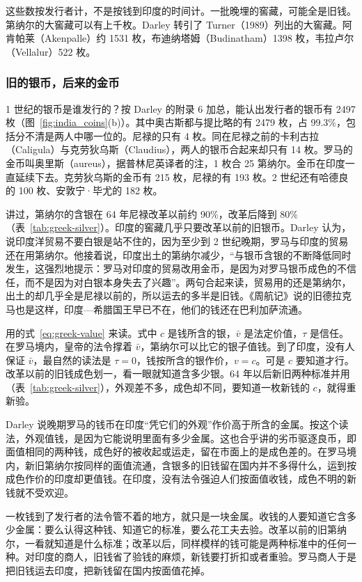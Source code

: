 这些数按发行者计，不是按钱到印度的时间计。一批晚埋的窖藏，可能全是旧钱。第纳尔的大窖藏可以有上千枚。Darley 转引了 Turner（1989）列出的大窖藏。阿肯帕莱（Akenpalle）约 1531 枚，布迪纳塔姆（Budinatham）1398 枚，韦拉卢尔（Vellalur）522 枚\cite{darley2014}。

\subsubsection{旧的银币，后来的金币}
1 世纪的银币是谁发行的？按 Darley 的附录 6 加总，能认出发行者的银币有 2497 枚（图~\ref{fig:india_coins}(b)）。其中奥古斯都与提比略的有 2479 枚，占 99.3\%，包括分不清是两人中哪一位的。尼禄的只有 4 枚。同在尼禄之前的卡利古拉（Caligula）与克劳狄乌斯（Claudius），两人的银币合起来却只有 14 枚。罗马的金币叫奥里斯（aureus），据普林尼英译者的注，1 枚合 25 第纳尔\cite{pliny}。金币在印度一直延续下去。克劳狄乌斯的金币有 215 枚，尼禄的有 193 枚。2 世纪还有哈德良的 100 枚、安敦宁·毕尤的 182 枚。

讲过，第纳尔的含银在 64 年尼禄改革以前约 90\%，改革后降到 80\%（表~\ref{tab:greek-silver}）。印度的窖藏几乎只要改革以前的旧银币。Darley 认为，说印度洋贸易不要白银是站不住的，因为至少到 2 世纪晚期，罗马与印度的贸易还在用第纳尔。他接着说，印度出土的第纳尔减少，“与银币含银的不断降低同时发生，这强烈地提示：罗马对印度的贸易改用金币，是因为对罗马银币成色的不信任，而不是因为对白银本身失去了兴趣”\cite{darley2014}。两句合起来读，贸易用的还是第纳尔，出土的却几乎全是尼禄以前的，所以运去的多半是旧钱。《周航记》说的旧德拉克马也是这样，印度—希腊国王早已不在，他们的钱还在巴利加萨流通\cite{periplus}。

用的式~\eqref{eq:greek-value} 来读。式中 $c$ 是钱所含的银，$\bar v$ 是法定价值，$\tau$ 是信任。在罗马境内，皇帝的法令撑着 $\bar v$，第纳尔可以比它的银子值钱。到了印度，没有人保证 $\bar v$，最自然的读法是 $\tau=0$，钱按所含的银作价，$v=c$。可是 $c$ 要知道才行。改革以前的旧钱成色划一，看一眼就知道含多少银。64 年以后新旧两种标准并用（表~\ref{tab:greek-silver}），外观差不多，成色却不同，要知道一枚新钱的 $c$，就得重新验。

Darley 说晚期罗马的钱币在印度“凭它们的外观”作价高于所含的金属。按这个读法，外观值钱，是因为它能说明里面有多少金属。这也合乎讲的劣币驱逐良币，即面值相同的两种钱，成色好的被收起或运走，留在市面上的是成色差的。在罗马境内，新旧第纳尔按同样的面值流通，含银多的旧钱留在国内并不多得什么，运到按成色作价的印度却更值钱。在印度，没有法令强迫人们按面值收钱，成色不明的新钱就不受欢迎。

\begin{intuition}[看得出成色的钱才好用]
一枚钱到了发行者的法令管不着的地方，就只是一块金属。收钱的人要知道它含多少金属：要么认得这种钱、知道它的标准，要么花工夫去验。改革以前的旧第纳尔，一看就知道是什么标准；改革以后，同样模样的钱可能是两种标准中的任何一种。对印度的商人，旧钱省了验钱的麻烦，新钱要打折扣或者重验。罗马商人于是把旧钱运去印度，把新钱留在国内按面值花掉。
\end{intuition}

